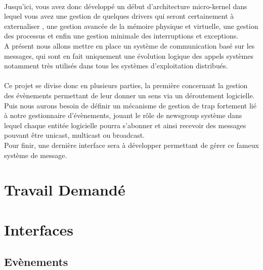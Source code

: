 \documentclass[10pt,a4wide]{article}
\begin{document}
\paragraph{}

Jusqu'ici, vous avez donc d\'evelopp\'e un d\'ebut d'architecture micro-kernel dans lequel
vous avez une gestion de quelques drivers qui seront certainement \`a externaliser
, une gestion avanc\'ee de la m\'emoire physique et virtuelle, une gestion des processus et
enfin une gestion minimale des interruptions et exceptions.\\
A pr\'esent nous allons mettre en place un syst\`eme de communication bas\'e sur les messages, qui sont
en fait uniquement une \'evolution logique des appels syst\`emes notamment tr\`es utilis\'es dans tous
les syst\`emes d'exploitation distribu\'es.

\paragraph{}

Ce projet se divise donc en plusieurs parties, la premi\`ere concernant la gestion des \'ev\`enements
permettant de leur donner un sens via un d\'eroutement logicielle.\\
Puis nous aurons besoin de d\'efinir un m\'ecanisme de gestion de trap fortement li\'e \`a notre
gestionnaire d'\'ev\`enements, jouant le r\^ole de newsgroup syst\`eme dans lequel chaque entit\'ee
logicielle pourra s'abonner et ainsi recevoir des messages pouvant \^etre unicast, multicast ou broadcast.\\
Pour finir, une derni\`ere interface sera \`a d\'evelopper permettant de g\'erer ce fameux syst\`eme
de message.

\section{Travail Demand\'e}

\section{Interfaces}

\subsection{Ev\`enements}

\paragraph{}
\end{document}

